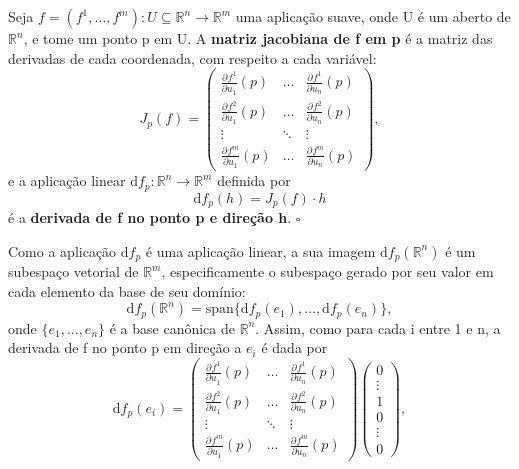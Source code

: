 \documentclass[../differential_geometry.tex]{subfiles}
\begin{document}
\begin{def*}
	Seja \(f=(f^{1},\dotsc, f^{m}):U\subseteq \mathbb{R}^{n}\rightarrow \mathbb{R}^{m}\) uma aplicação suave, onde U é um aberto de \(\mathbb{R}^{n}\), e tome um ponto p em U. A \textbf{matriz jacobiana de f em p} é a matriz das derivadas de cada coordenada, com respeito a cada variável:
	\[
		J_{p}(f)=\begin{pmatrix}
			\frac{\partial^{}f^{1}}{\partial u_{1}^{}}(p) & \dotsc & \frac{\partial^{}f^{1}}{\partial u_{n}^{}}(p) \\
			\frac{\partial^{}f^{2}}{\partial u_{1}^{}}(p) & \dotsc & \frac{\partial^{}f^{2}}{\partial u_{n}^{}}(p) \\
			\vdots                                        & \ddots & \vdots                                        \\
			\frac{\partial^{}f^{m}}{\partial u_{1}^{}}(p) & \dotsc & \frac{\partial^{}f^{m}}{\partial u_{n}^{}}(p)
		\end{pmatrix},
	\]
	e a aplicação linear \(\mathrm{d}f_{p}:\mathbb{R}^{n}\rightarrow \mathbb{R}^{m}\) definida por
	\[
		\mathrm{d}f_{p}(h)=J_{p}(f)\cdot h
	\]
	é a \textbf{derivada de f no ponto p e direção h}. \(\square\)
\end{def*}
Como a aplicação \(\mathrm{d}f_{p}\) é uma aplicação linear, a sua imagem \(\mathrm{d}f_{p}(\mathbb{R}^{n})\) é um subespaço vetorial de \(\mathbb{R}^{m}\), especificamente o subespaço gerado por seu valor em cada elemento da base de seu domínio:
\[
	\mathrm{d}f_{p}(\mathbb{R}^{n})=\mathrm{span}\{\mathrm{d}f_{p}(e_1), \dotsc , \mathrm{d}f_{p}(e_{n})\},
\]
onde \(\{e_1,\dotsc , e_{n}\}\) é a base canônica de \(\mathbb{R}^{n}\). Assim, como para cada i entre 1 e n, a derivada de f no ponto p em direção a \(e_{i}\) é dada por
\[
	\mathrm{d}f_{p}(e_{i})=\begin{pmatrix}
		\frac{\partial^{}f^{1}}{\partial u_{1}^{}}(p) & \dotsc & \frac{\partial^{}f^{1}}{\partial u_{n}^{}}(p) \\
		\frac{\partial^{}f^{2}}{\partial u_{1}^{}}(p) & \dotsc & \frac{\partial^{}f^{2}}{\partial u_{n}^{}}(p) \\
		\vdots                                        & \ddots & \vdots                                        \\
		\frac{\partial^{}f^{m}}{\partial u_{1}^{}}(p) & \dotsc & \frac{\partial^{}f^{m}}{\partial u_{n}^{}}(p)
	\end{pmatrix} \begin{pmatrix}
		0      \\
		\vdots \\
		1      \\
		0      \\
		\vdots \\
		0
	\end{pmatrix},
\]
\end{document}
